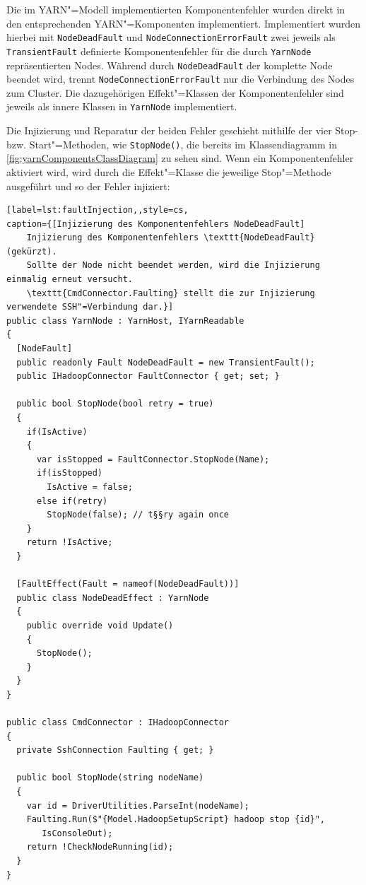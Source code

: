 Die im YARN"=Modell implementierten Komponentenfehler wurden direkt in den entsprechenden YARN"=Komponenten implementiert.
Implementiert wurden hierbei mit \texttt{NodeDeadFault} und \texttt{NodeConnectionErrorFault} zwei jeweils als \texttt{TransientFault} definierte Komponentenfehler für die durch \texttt{YarnNode} repräsentierten Nodes.
Während durch \texttt{NodeDeadFault} der komplette Node beendet wird, trennt \texttt{NodeConnectionErrorFault} nur die Verbindung des Nodes zum Cluster.
Die dazugehörigen Effekt"=Klassen der Komponentenfehler sind jeweils als innere Klassen in \texttt{YarnNode} implementiert.

Die Injizierung und Reparatur der beiden Fehler geschieht mithilfe der vier Stop- bzw. Start"=Methoden, wie \zB \texttt{StopNode()}, die bereits im Klassendiagramm in \cref{fig:yarnComponentsClassDiagram} zu sehen sind.
Wenn ein Komponentenfehler aktiviert wird, wird durch die Effekt"=Klasse die jeweilige Stop"=Methode ausgeführt und so der Fehler injiziert:

\begin{lstlisting}[label=lst:faultInjection,,style=cs,
caption={[Injizierung des Komponentenfehlers NodeDeadFault]
    Injizierung des Komponentenfehlers \texttt{NodeDeadFault} (gekürzt).
    Sollte der Node nicht beendet werden, wird die Injizierung einmalig erneut versucht.
    \texttt{CmdConnector.Faulting} stellt die zur Injizierung verwendete SSH"=Verbindung dar.}]
public class YarnNode : YarnHost, IYarnReadable
{
  [NodeFault]
  public readonly Fault NodeDeadFault = new TransientFault();
  public IHadoopConnector FaultConnector { get; set; }
  
  public bool StopNode(bool retry = true)
  {
    if(IsActive)
    {
      var isStopped = FaultConnector.StopNode(Name);
      if(isStopped)
        IsActive = false;
      else if(retry)
        StopNode(false); // t§§ry again once
    }
    return !IsActive;
  }
  
  [FaultEffect(Fault = nameof(NodeDeadFault))]
  public class NodeDeadEffect : YarnNode
  {
    public override void Update()
    {
      StopNode();
    }
  }
}

public class CmdConnector : IHadoopConnector
{
  private SshConnection Faulting { get; }
  
  public bool StopNode(string nodeName)
  {
    var id = DriverUtilities.ParseInt(nodeName);
    Faulting.Run($"{Model.HadoopSetupScript} hadoop stop {id}",
       IsConsoleOut);
    return !CheckNodeRunning(id);
  }
}
\end{lstlisting}

